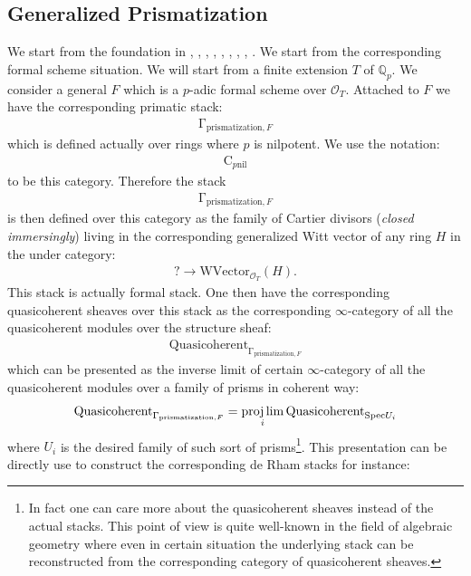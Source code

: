 \documentclass[12pt]{article}
\theoremstyle{definition}
\begin{document}
\subsection{Generalized Prismatization}
We start from the foundation in \cite{BSI}, \cite{BLI}, \cite{DI}, \cite{SchI}, \cite{ALBRCS}, \cite{TI}, \cite{TII}, \cite{TIII}, \cite{TVI}. We start from the corresponding formal scheme situation. We will start from a finite extension $T$ of $\mathbb{Q}_p$. We consider a general $F$ which is a $p$-adic formal scheme over $\mathcal{O}_T$. Attached to $F$ we have the corresponding primatic stack:
\begin{align}
\mathrm{\Gamma}_{\mathrm{prismatization},F}
\end{align}  
which is defined actually over rings where $p$ is nilpotent. We use the notation:
\begin{align}
\mathrm{C}_{p\mathrm{nil}} 
\end{align}
to be this category. Therefore the stack
\begin{align}
\mathrm{\Gamma}_{\mathrm{prismatization},F}
\end{align} 
is then defined over this category as the family of Cartier divisors (\textit{closed immersingly}) living in the corresponding generalized Witt vector of any ring $H$ in the under category:
\begin{align}
?\rightarrow \mathrm{WVector}_{\mathcal{O}_T}(H).
\end{align}
This stack is actually formal stack. One then have the corresponding quasicoherent sheaves over this stack as the corresponding $\infty$-category of all the quasicoherent modules over the structure sheaf:
\begin{align}
\mathrm{Quasicoherent}_{\mathrm{\Gamma}_{\mathrm{prismatization},F}}
\end{align}
which can be presented as the inverse limit of certain $\infty$-category of all the quasicoherent modules over a family of prisms in coherent way:
\begin{align}
\mathrm{Quasicoherent}_{\mathrm{\Gamma}_{\mathrm{prismatization},F}}=\projlim_i \mathrm{Quasicoherent}_{\mathrm{Spec}U_i}
\end{align}
where $U_i$ is the desired family of such sort of prisms\footnote{In fact one can care more about the quasicoherent sheaves instead of the actual stacks. This point of view is quite well-known in the field of algebraic geometry where even in certain situation the underlying stack can be reconstructed from the corresponding category of quasicoherent sheaves.}. This presentation can be directly use to construct the corresponding de Rham stacks for instance:
\end{document}
